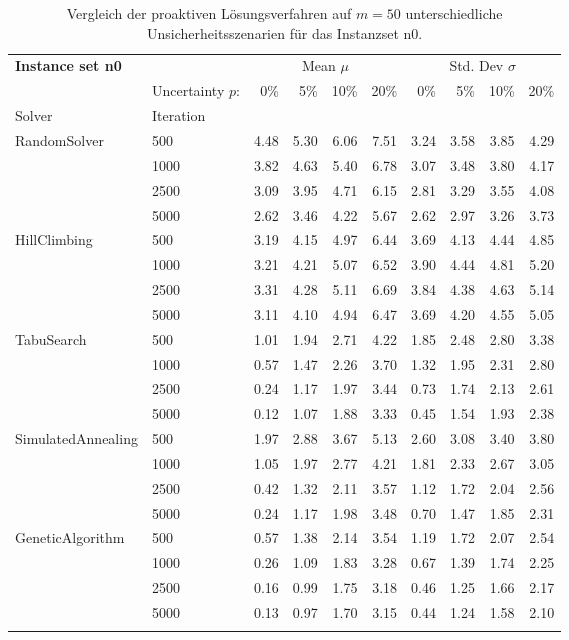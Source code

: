 {\footnotesize
\begin{longtable}{ll|rrrr|rrrr}
\toprule
\textbf{Instance set n0}                 & {} & \multicolumn{4}{c|}{Mean $\mu$} & \multicolumn{4}{c}{Std. Dev $\sigma$} \\
                & Uncertainty $p$: & 0\% & 5\% & 10\% & 20\% & 0\% & 5\% & 10\% & 20\% \\
Solver & Iteration &      &      &      &      &      &      &      &      \\
\midrule
RandomSolver & 500  & 4.48 & 5.30 & 6.06 & 7.51 & 3.24 & 3.58 & 3.85 & 4.29 \\
                 & 1000 & 3.82 & 4.63 & 5.40 & 6.78 & 3.07 & 3.48 & 3.80 & 4.17 \\
                 & 2500 & 3.09 & 3.95 & 4.71 & 6.15 & 2.81 & 3.29 & 3.55 & 4.08 \\
                 & 5000 & 2.62 & 3.46 & 4.22 & 5.67 & 2.62 & 2.97 & 3.26 & 3.73 \\ \hline
HillClimbing & 500  & 3.19 & 4.15 & 4.97 & 6.44 & 3.69 & 4.13 & 4.44 & 4.85 \\
                 & 1000 & 3.21 & 4.21 & 5.07 & 6.52 & 3.90 & 4.44 & 4.81 & 5.20 \\
                 & 2500 & 3.31 & 4.28 & 5.11 & 6.69 & 3.84 & 4.38 & 4.63 & 5.14 \\
                 & 5000 & 3.11 & 4.10 & 4.94 & 6.47 & 3.69 & 4.20 & 4.55 & 5.05 \\ \hline
TabuSearch & 500  & 1.01 & 1.94 & 2.71 & 4.22 & 1.85 & 2.48 & 2.80 & 3.38 \\
                 & 1000 & 0.57 & 1.47 & 2.26 & 3.70 & 1.32 & 1.95 & 2.31 & 2.80 \\
                 & 2500 & 0.24 & 1.17 & 1.97 & 3.44 & 0.73 & 1.74 & 2.13 & 2.61 \\
                 & 5000 & 0.12 & 1.07 & 1.88 & 3.33 & 0.45 & 1.54 & 1.93 & 2.38 \\ \hline
SimulatedAnnealing & 500  & 1.97 & 2.88 & 3.67 & 5.13 & 2.60 & 3.08 & 3.40 & 3.80 \\
                 & 1000 & 1.05 & 1.97 & 2.77 & 4.21 & 1.81 & 2.33 & 2.67 & 3.05 \\
                 & 2500 & 0.42 & 1.32 & 2.11 & 3.57 & 1.12 & 1.72 & 2.04 & 2.56 \\
                 & 5000 & 0.24 & 1.17 & 1.98 & 3.48 & 0.70 & 1.47 & 1.85 & 2.31 \\ \hline
GeneticAlgorithm & 500  & 0.57 & 1.38 & 2.14 & 3.54 & 1.19 & 1.72 & 2.07 & 2.54 \\
                 & 1000 & 0.26 & 1.09 & 1.83 & 3.28 & 0.67 & 1.39 & 1.74 & 2.25 \\
                 & 2500 & 0.16 & 0.99 & 1.75 & 3.18 & 0.46 & 1.25 & 1.66 & 2.17 \\
                 & 5000 & 0.13 & 0.97 & 1.70 & 3.15 & 0.44 & 1.24 & 1.58 & 2.10 \\
\bottomrule
\caption{Vergleich der proaktiven Lösungsverfahren auf $m=50$ unterschiedliche Unsicherheitsszenarien für das Instanzset n0. }
\label{tab:evaluation_proactive_n0}
\end{longtable}
}
